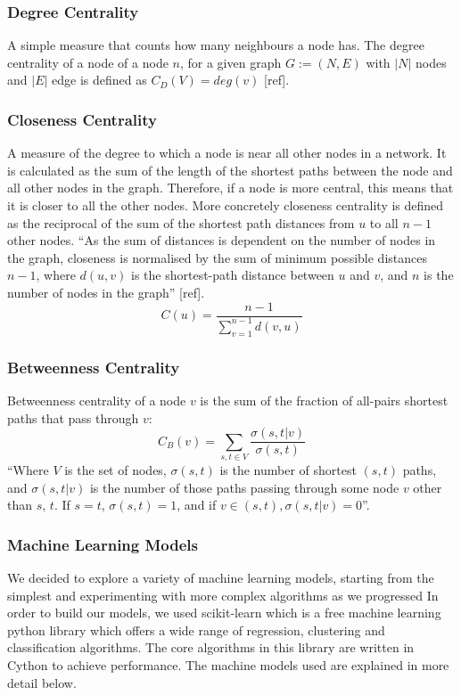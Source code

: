 \documentclass[9pt]{article}
\begin{document}
\subsubsection{Degree Centrality}
A simple measure that counts how many neighbours a node has. The degree centrality of a node of a node \(n\), for a given graph \(G:=(N,E)\) with \(|N|\) nodes and \(|E|\) edge is defined as \(C_D(V) = deg(v)\) [ref]. 

\subsubsection{Closeness Centrality}
A measure of the degree to which a node is near all other nodes in a network. It is calculated as the sum of the length of the shortest paths between the node and all other nodes in the graph. Therefore, if a node is more central, this means that it is closer to all the other nodes. More concretely closeness centrality is defined as the reciprocal of the sum of the shortest path distances from \(u\) to all \(n-1\) other nodes. “As the sum of distances is dependent on the number of nodes in the graph, closeness is normalised by the sum of minimum possible distances \(n-1\),  where \(d(u, v)\) is the shortest-path distance between \(u\) and \(v\), and \(n\) is the number of nodes in the graph” [ref]. 
\begin{equation}
C(u)=\frac{n-1}{\sum_{v=1}^{n-1} d(v,u)}
\end{equation}

\subsubsection{Betweenness Centrality}
Betweenness centrality of a node \(v\) is the sum of the fraction of all-pairs shortest paths that pass through \(v\):
\begin{equation}
C_B(v)=\sum_{s,t\in{V}}\frac{\sigma(s, t|v)}{\sigma(s, t)}
\end{equation}
“Where \(V\) is the set of nodes, \(\sigma(s, t)\) is the number of shortest \((s, t)\) paths, and \(\sigma(s, t|v)\) is the number of those paths passing through some node \(v\) other than \(s\), \(t\). If \(s = t\), \(\sigma(s, t) = 1\), and if \(v \in (s, t), \sigma(s, t|v) = 0\)”.

\subsubsection{Machine Learning Models}
We decided to explore a variety of machine learning models, starting from the simplest and experimenting with more complex algorithms as we progressed In order to build our models, we used scikit-learn which is a free machine learning python library which offers a wide range of regression, clustering and classification algorithms. The core algorithms in this library are written in Cython to achieve performance. The machine models used are explained in more detail below. 
\end{document}
